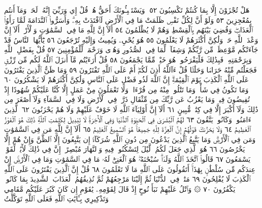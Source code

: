 هَلْ تُجْزَوْنَ إِلَّا بِمَا كُنتُمْ تَكْسِبُونَ ٥٢۞ وَيَسْتَنۢبِـُٔونَكَ
أَحَقٌّ هُوَۖ قُلْ إِي وَرَبِّيٓ إِنَّهُۥ لَحَقࣱّۖ وَمَآ أَنتُم بِمُعْجِزِينَ ٥٣
وَلَوْ أَنَّ لِكُلِّ نَفْسࣲ ظَلَمَتْ مَا فِي ٱلْأَرْضِ لَٱفْتَدَتْ بِهِۦۗ وَأَسَرُّوا۟
ٱلنَّدَامَةَ لَمَّا رَأَوُا۟ ٱلْعَذَابَۖ وَقُضِيَ بَيْنَهُم بِٱلْقِسْطِ وَهُمْ
لَا يُظْلَمُونَ ٥٤ أَلَآ إِنَّ لِلَّهِ مَا فِي ٱلسَّمَٰوَٰتِ وَٱلْأَرْضِۗ أَلَآ إِنَّ
وَعْدَ ٱللَّهِ حَقࣱّ وَلَٰكِنَّ أَكْثَرَهُمْ لَا يَعْلَمُونَ ٥٥ هُوَ يُحْيِۦ وَيُمِيتُ
وَإِلَيْهِ تُرْجَعُونَ ٥٦ يَٰٓأَيُّهَا ٱلنَّاسُ قَدْ جَآءَتْكُم مَّوْعِظَةࣱ
مِّن رَّبِّكُمْ وَشِفَآءࣱ لِّمَا فِي ٱلصُّدُورِ وَهُدࣰى وَرَحْمَةࣱ لِّلْمُؤْمِنِينَ ٥٧
قُلْ بِفَضْلِ ٱللَّهِ وَبِرَحْمَتِهِۦ فَبِذَٰلِكَ فَلْيَفْرَحُوا۟ هُوَ خَيْرࣱ مِّمَّا
يَجْمَعُونَ ٥٨ قُلْ أَرَءَيْتُم مَّآ أَنزَلَ ٱللَّهُ لَكُم مِّن رِّزْقࣲ
فَجَعَلْتُم مِّنْهُ حَرَامࣰا وَحَلَٰلࣰا قُلْ ءَآللَّهُ أَذِنَ لَكُمْۖ أَمْ عَلَى
ٱللَّهِ تَفْتَرُونَ ٥٩ وَمَا ظَنُّ ٱلَّذِينَ يَفْتَرُونَ عَلَى ٱللَّهِ ٱلْكَذِبَ
يَوْمَ ٱلْقِيَٰمَةِۗ إِنَّ ٱللَّهَ لَذُو فَضْلٍ عَلَى ٱلنَّاسِ وَلَٰكِنَّ أَكْثَرَهُمْ
لَا يَشْكُرُونَ ٦٠ وَمَا تَكُونُ فِي شَأْنࣲ وَمَا تَتْلُوا۟ مِنْهُ مِن قُرْءَانࣲ
وَلَا تَعْمَلُونَ مِنْ عَمَلٍ إِلَّا كُنَّا عَلَيْكُمْ شُهُودًا إِذْ تُفِيضُونَ
فِيهِۚ وَمَا يَعْزُبُ عَن رَّبِّكَ مِن مِّثْقَالِ ذَرَّةࣲ فِي ٱلْأَرْضِ وَلَا فِي
ٱلسَّمَآءِ وَلَآ أَصْغَرَ مِن ذَٰلِكَ وَلَآ أَكْبَرَ إِلَّا فِي كِتَٰبࣲ مُّبِينٍ ٦١
أَلَآ إِنَّ أَوْلِيَآءَ ٱللَّهِ لَا خَوْفٌ عَلَيْهِمْ وَلَا هُمْ يَحْزَنُونَ ٦٢
ٱلَّذِينَ ءَامَنُوا۟ وَكَانُوا۟ يَتَّقُونَ ٦٣ لَهُمُ ٱلْبُشْرَىٰ
فِي ٱلْحَيَوٰةِ ٱلدُّنْيَا وَفِي ٱلْأٓخِرَةِۚ لَا تَبْدِيلَ لِكَلِمَٰتِ
ٱللَّهِۚ ذَٰلِكَ هُوَ ٱلْفَوْزُ ٱلْعَظِيمُ ٦٤ وَلَا يَحْزُنكَ قَوْلُهُمْۘ إِنَّ
ٱلْعِزَّةَ لِلَّهِ جَمِيعًاۚ هُوَ ٱلسَّمِيعُ ٱلْعَلِيمُ ٦٥ أَلَآ إِنَّ لِلَّهِ
مَن فِي ٱلسَّمَٰوَٰتِ وَمَن فِي ٱلْأَرْضِۗ وَمَا يَتَّبِعُ ٱلَّذِينَ
يَدْعُونَ مِن دُونِ ٱللَّهِ شُرَكَآءَۚ إِن يَتَّبِعُونَ إِلَّا ٱلظَّنَّ
وَإِنْ هُمْ إِلَّا يَخْرُصُونَ ٦٦ هُوَ ٱلَّذِي جَعَلَ لَكُمُ
ٱلَّيْلَ لِتَسْكُنُوا۟ فِيهِ وَٱلنَّهَارَ مُبْصِرًاۚ إِنَّ فِي ذَٰلِكَ
لَأٓيَٰتࣲ لِّقَوْمࣲ يَسْمَعُونَ ٦٧ قَالُوا۟ ٱتَّخَذَ ٱللَّهُ وَلَدࣰاۗ
سُبْحَٰنَهُۥۖ هُوَ ٱلْغَنِيُّۖ لَهُۥ مَا فِي ٱلسَّمَٰوَٰتِ وَمَا فِي ٱلْأَرْضِۚ
إِنْ عِندَكُم مِّن سُلْطَٰنِۭ بِهَٰذَآۚ أَتَقُولُونَ عَلَى ٱللَّهِ
مَا لَا تَعْلَمُونَ ٦٨ قُلْ إِنَّ ٱلَّذِينَ يَفْتَرُونَ عَلَى ٱللَّهِ ٱلْكَذِبَ
لَا يُفْلِحُونَ ٦٩ مَتَٰعࣱ فِي ٱلدُّنْيَا ثُمَّ إِلَيْنَا مَرْجِعُهُمْ ثُمَّ
نُذِيقُهُمُ ٱلْعَذَابَ ٱلشَّدِيدَ بِمَا كَانُوا۟ يَكْفُرُونَ ٧٠
۞ وَٱتْلُ عَلَيْهِمْ نَبَأَ نُوحٍ إِذْ قَالَ لِقَوْمِهِۦ يَٰقَوْمِ إِن كَانَ كَبُرَ
عَلَيْكُم مَّقَامِي وَتَذْكِيرِي بِـَٔايَٰتِ ٱللَّهِ فَعَلَى ٱللَّهِ تَوَكَّلْتُ
